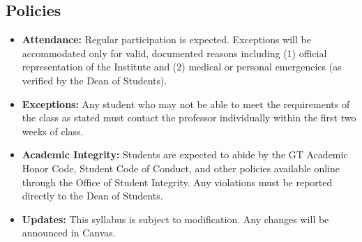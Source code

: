 \subsection*{Policies}
\begin{itemize}[labelwidth=]
    \item \textbf{Attendance:} Regular participation is expected. Exceptions will be accommodated only for valid, documented reasons including (1) official representation of the Institute and (2) medical or personal emergencies (as verified by the Dean of Students).
    \item \textbf{Exceptions:} Any student who may not be able to meet the requirements of the class as stated must contact the professor individually within the first two weeks of class.
    \item \textbf{Academic Integrity:} Students are expected to abide by the GT Academic Honor Code, Student Code of Conduct, and other policies available online through the Office of Student Integrity. Any violations must be reported directly to the Dean of Students.
    \item \textbf{Updates:} This syllabus is subject to modification. Any changes will be announced in Canvas.
\end{itemize}